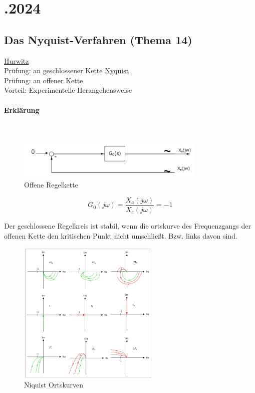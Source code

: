 \documentclass{article}
\begin{document}
\newpage
\section*{.2024}
\subsection*{Das Nyquist-Verfahren (Thema 14)}
\vspace{1em}
\begin{paracol}{2}
	\underline{Hurwitz} \\
	Prüfung: an geschlossener Kette
	\switchcolumn
	\underline{Nyquist} \\
	Prüfung: an offener Kette \\
	Vorteil: Experimentelle Herangehensweise
\end{paracol}
\paragraph{Erklärung} \mbox{} \\
\begin{figure}[ht]
	\centering
	\includegraphics[width=0.8\textwidth]{2024_12_03_nyquist.png}
	\caption{Offene Regelkette}
\end{figure}
\[ G_0(j\omega) = \frac{X_a(j\omega)}{X_e(j\omega)} = -1 \]

\vspace{1em}

Der geschlossene Regelkreis ist stabil, wenn die ortskurve des Frequenzgangs der offenen Kette den kritischen Punkt nicht umschließt. Bzw. links davon sind.
\begin{figure}[ht]
	\centering
	\includegraphics[width=0.6\textwidth]{2024_12_03_nyquist_ortskurven.png}
	\caption{Niquist Ortskurven}
\end{figure}
\end{document}
